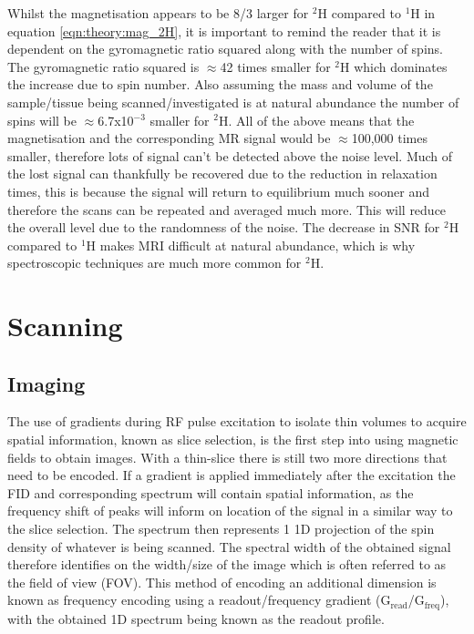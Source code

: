 \documentclass[class=article, crop=false]{standalone}
\begin{document}
Whilst the magnetisation appears to be 8/3 larger for $^2$H compared to $^1$H in equation \ref{eqn:theory:mag_2H}, it is important to remind the reader that it is dependent on the gyromagnetic ratio squared along with the number of spins. The gyromagnetic ratio squared is $\approx$42 times smaller for $^2$H which dominates the increase due to spin number. Also assuming the mass and volume of the sample/tissue being scanned/investigated is at natural abundance the number of spins will be $\approx$6.7x10$^{-3}$ smaller for $^2$H. All of the above means that the magnetisation and the corresponding MR signal would be $\approx$100,000 times smaller, therefore lots of signal can't be detected above the noise level. Much of the lost signal can thankfully be recovered due to the reduction in relaxation times, this is because the signal will return to equilibrium much sooner and therefore the scans can be repeated and averaged much more. This will reduce the overall level due to the randomness of the noise. The decrease in SNR for $^2$H compared to $^1$H makes MRI difficult at natural abundance, which is why spectroscopic techniques are much more common for $^2$H. 


\section{Scanning}   

\subsection{Imaging}

The use of gradients during RF pulse excitation to isolate thin volumes to acquire spatial information, known as slice selection, is the first step into using magnetic fields to obtain images. With a thin-slice there is still two more directions that need to be encoded. If a gradient is applied immediately after the excitation the FID and corresponding spectrum will contain spatial information, as the frequency shift of peaks will inform on location of the signal in a similar way to the slice selection. The spectrum then represents 1 1D projection of the spin density of whatever is being scanned. The spectral width of the obtained signal therefore identifies on the width/size of the image which is often referred to as the field of view (FOV). This method of encoding an additional dimension is known as frequency encoding using a readout/frequency gradient (G$_{\textrm{read}}$/G$_{\textrm{freq}}$), with the obtained 1D spectrum being known as the readout profile.
\end{document}
